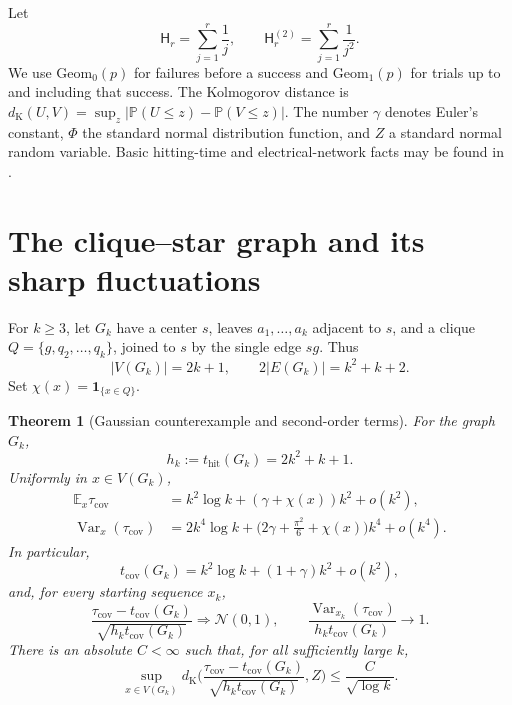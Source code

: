 \documentclass[11pt]{amsart}
\newtheorem{theorem}{Theorem}[section]
\theoremstyle{remark}
\numberwithin{equation}{section}
\DeclareMathOperator{\Var}{Var}
\newcommand{\E}{\mathbb{E}}
\newcommand{\Prob}{\mathbb{P}}
\newcommand{\tcov}{t_{\mathrm{cov}}}
\newcommand{\thit}{t_{\mathrm{hit}}}
\newcommand{\taucov}{\tau_{\mathrm{cov}}}
\newcommand{\dK}{d_{\mathrm{K}}}
\newcommand{\Harm}{\mathsf{H}}
\newcommand{\Geom}{\mathrm{Geom}}
\newcommand{\Nor}{\mathcal{N}}
\newcommand{\ind}{\mathbf{1}}
\begin{document}
Let
\[
\Harm_r=\sum_{j=1}^r\frac1j,\qquad \Harm^{(2)}_r=\sum_{j=1}^r\frac1{j^2}.
\]
We use $\Geom_0(p)$ for failures before a success and $\Geom_1(p)$ for trials up to and including that success. The Kolmogorov distance is $\dK(U,V)=\sup_z|\Prob(U\le z)-\Prob(V\le z)|$. The number $\gamma$ denotes Euler's constant, $\Phi$ the standard normal distribution function, and $Z$ a standard normal random variable. Basic hitting-time and electrical-network facts may be found in \cite{AldousFill,LevinPeres,DoyleSnell}.

\section{The clique--star graph and its sharp fluctuations}\label{sec:cliquestar}

For $k\ge 3$, let $G_k$ have a center $s$, leaves $a_1,\dots,a_k$ adjacent to $s$, and a clique $Q=\{g,q_2,\dots,q_k\}$, joined to $s$ by the single edge $sg$. Thus
\[
|V(G_k)|=2k+1,\qquad 2|E(G_k)|=k^2+k+2.
\]
Set $\chi(x)=\ind_{\{x\in Q\}}$.

\begin{theorem}[Gaussian counterexample and second-order terms]\label{thm:main}
For the graph $G_k$,
\begin{equation}\label{eq:thit}
h_k:=\thit(G_k)=2k^2+k+1.
\end{equation}
Uniformly in $x\in V(G_k)$,
\begin{align}
\E_x\taucov&=k^2\log k+(\gamma+\chi(x))k^2+o(k^2),\label{eq:mean2}\\
\Var_x(\taucov)&=2k^4\log k+\Big(2\gamma+\frac{\pi^2}{6}+\chi(x)\Big)k^4+o(k^4).\label{eq:var2}
\end{align}
In particular,
\begin{equation}\label{eq:tcov}
\tcov(G_k)=k^2\log k+(1+\gamma)k^2+o(k^2),
\end{equation}
and, for every starting sequence $x_k$,
\begin{equation}\label{eq:clt}
\frac{\taucov-\tcov(G_k)}{\sqrt{h_k\tcov(G_k)}}\Longrightarrow\Nor(0,1),\qquad
\frac{\Var_{x_k}(\taucov)}{h_k\tcov(G_k)}\longrightarrow 1.
\end{equation}
There is an absolute $C<\infty$ such that, for all sufficiently large $k$,
\begin{equation}\label{eq:be}
\sup_{x\in V(G_k)}\dK\Big(\frac{\taucov-\tcov(G_k)}{\sqrt{h_k\tcov(G_k)}},Z\Big)\le\frac{C}{\sqrt{\log k}}.
\end{equation}
\end{theorem}
\end{document}
